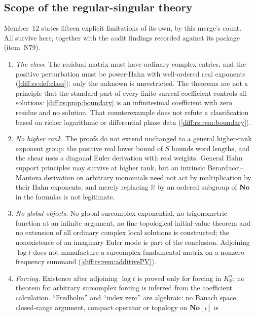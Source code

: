 \documentclass[11pt,letterpaper]{article}
\numberwithin{equation}{section}
\theoremstyle{definition}
\theoremstyle{remark}
\newcommand{\No}{\mathbf{No}}
\newcommand{\SC}{\mathbf{No}[i]}
\newcommand{\R}{\mathbb R}
\newcommand{\KR}{K_{\R}}
\begin{document}
\subsection{Scope of the regular-singular theory}
\label{diff:rs:sub:nc}

Member~12 states fifteen explicit limitations of its own, by this merge's
count. All survive here, together with the audit findings recorded against its
package (item~N79).

\begin{enumerate}[label=\textup{N\arabic*.},leftmargin=3.0em,itemsep=0.35em,start=65]
\item \emph{The class.} The residual matrix must have ordinary complex entries,
and the positive perturbation must be power-Hahn with well-ordered real
exponents (\cref{diff:rs:def:class}); only the unknown is unrestricted. The
theorems are not a principle that the standard part of every finite surreal
coefficient controls all solutions: \cref{diff:rs:prop:boundary} is an
infinitesimal coefficient with zero residue and no solution. That counterexample
does not refute a classification based on richer logarithmic or differential
phase data (\cref{diff:rs:rem:boundary}).
\item \emph{No higher rank.} The proofs do not extend unchanged to a general
higher-rank exponent group: the positive real lower bound of $S$ bounds word
lengths, and the shear uses a diagonal Euler derivation with real weights. General
Hahn support principles may survive at higher rank, but an intrinsic
Berarducci--Mantova derivation on arbitrary monomials need not act by
multiplication by their Hahn exponents, and merely replacing $\R$ by an ordered
subgroup of $\No$ in the formulas is not legitimate.
\item \emph{No global objects.} No global surcomplex exponential, no
trigonometric function at an infinite argument, no fine-topological
initial-value theorem and no extension of all ordinary complex local solutions
is constructed; the nonexistence of an imaginary Euler mode is part of the
conclusion. Adjoining $\log t$ does not manufacture a surcomplex fundamental
matrix on a nonzero-frequency summand (\cref{diff:rs:rem:additivePV}).
\item \emph{Forcing.} Existence after adjoining $\log t$ is proved only for
forcing in $\KR^{n}$; no theorem for arbitrary surcomplex forcing is inferred
from the coefficient calculation. ``Fredholm'' and ``index zero'' are algebraic:
no Banach space, closed-range argument, compact operator or topology on $\SC$ is

\end{enumerate}
\end{document}
